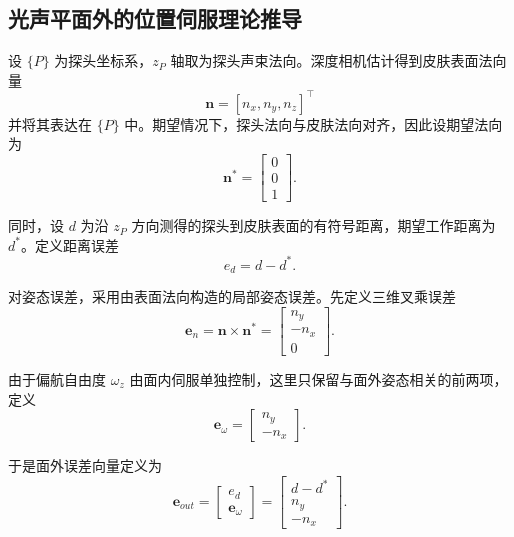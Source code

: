 \documentclass{article}
\begin{document}
\subsection{光声平面外的位置伺服理论推导}
\label{sec:out_of_plane}
\setlength{\abovedisplayskip}{6pt}
\setlength{\belowdisplayskip}{6pt}
设 $\{P\}$ 为探头坐标系，$z_P$ 轴取为探头声束法向。深度相机估计得到皮肤表面法向量
\[
\mathbf{n} = [n_x, n_y, n_z]^\top
\]
并将其表达在 $\{P\}$ 中。期望情况下，探头法向与皮肤法向对齐，因此设期望法向为
\begin{equation}
\mathbf{n}^{*} =
\begin{bmatrix}
0 \\ 0 \\ 1
\end{bmatrix}.
\end{equation}

同时，设 $d$ 为沿 $z_P$ 方向测得的探头到皮肤表面的有符号距离，期望工作距离为 $d^*$。定义距离误差
\begin{equation}
e_d = d - d^* .
\end{equation}

对姿态误差，采用由表面法向构造的局部姿态误差。先定义三维叉乘误差
\begin{equation}
\mathbf{e}_n = \mathbf{n} \times \mathbf{n}^{*}
=
\begin{bmatrix}
n_y \\ -n_x \\ 0
\end{bmatrix}.
\end{equation}

由于偏航自由度 $\omega_z$ 由面内伺服单独控制，这里只保留与面外姿态相关的前两项，定义
\begin{equation}
\mathbf{e}_{\omega} =
\begin{bmatrix}
n_y \\ -n_x
\end{bmatrix}.
\end{equation}

于是面外误差向量定义为
\begin{equation}
\mathbf{e}_{out}
=
\begin{bmatrix}
e_d \\ \mathbf{e}_{\omega}
\end{bmatrix}
=
\begin{bmatrix}
d - d^* \\ n_y \\ -n_x
\end{bmatrix}.
\end{equation}
\end{document}
